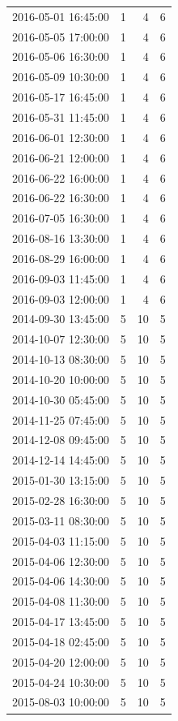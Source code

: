 \begin{tabular}{lrrr}
2016-05-01 16:45:00 & 1 & 4 & 6 \\
2016-05-05 17:00:00 & 1 & 4 & 6 \\
2016-05-06 16:30:00 & 1 & 4 & 6 \\
2016-05-09 10:30:00 & 1 & 4 & 6 \\
2016-05-17 16:45:00 & 1 & 4 & 6 \\
2016-05-31 11:45:00 & 1 & 4 & 6 \\
2016-06-01 12:30:00 & 1 & 4 & 6 \\
2016-06-21 12:00:00 & 1 & 4 & 6 \\
2016-06-22 16:00:00 & 1 & 4 & 6 \\
2016-06-22 16:30:00 & 1 & 4 & 6 \\
2016-07-05 16:30:00 & 1 & 4 & 6 \\
2016-08-16 13:30:00 & 1 & 4 & 6 \\
2016-08-29 16:00:00 & 1 & 4 & 6 \\
2016-09-03 11:45:00 & 1 & 4 & 6 \\
2016-09-03 12:00:00 & 1 & 4 & 6 \\
2014-09-30 13:45:00 & 5 & 10 & 5 \\
2014-10-07 12:30:00 & 5 & 10 & 5 \\
2014-10-13 08:30:00 & 5 & 10 & 5 \\
2014-10-20 10:00:00 & 5 & 10 & 5 \\
2014-10-30 05:45:00 & 5 & 10 & 5 \\
2014-11-25 07:45:00 & 5 & 10 & 5 \\
2014-12-08 09:45:00 & 5 & 10 & 5 \\
2014-12-14 14:45:00 & 5 & 10 & 5 \\
2015-01-30 13:15:00 & 5 & 10 & 5 \\
2015-02-28 16:30:00 & 5 & 10 & 5 \\
2015-03-11 08:30:00 & 5 & 10 & 5 \\
2015-04-03 11:15:00 & 5 & 10 & 5 \\
2015-04-06 12:30:00 & 5 & 10 & 5 \\
2015-04-06 14:30:00 & 5 & 10 & 5 \\
2015-04-08 11:30:00 & 5 & 10 & 5 \\
2015-04-17 13:45:00 & 5 & 10 & 5 \\
2015-04-18 02:45:00 & 5 & 10 & 5 \\
2015-04-20 12:00:00 & 5 & 10 & 5 \\
2015-04-24 10:30:00 & 5 & 10 & 5 \\
2015-08-03 10:00:00 & 5 & 10 & 5 \\

\end{tabular}
